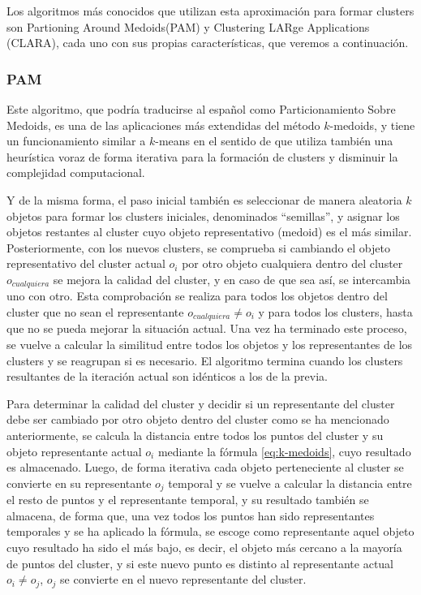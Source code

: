 \documentclass[10pt, a4paper]{article}
\begin{document}
Los algoritmos más conocidos que utilizan esta aproximación para formar clusters son Partioning Around Medoids(PAM) y Clustering LARge Applications (CLARA), cada uno con sus propias características, que veremos a continuación.


\subsubsection{\textbf{PAM}}

Este algoritmo, que podría traducirse al español como Particionamiento Sobre Medoids, es una de las aplicaciones más extendidas del método $k$-medoids, y tiene un funcionamiento similar a $k$-means en el sentido de que utiliza también una heurística voraz de forma iterativa para la formación de clusters y disminuir la complejidad computacional. 

Y de la misma forma, el paso inicial también es seleccionar de manera aleatoria $k$ objetos para formar los clusters iniciales, denominados ``semillas'', y asignar los objetos restantes al cluster cuyo objeto representativo (medoid) es el más similar. Posteriormente, con los nuevos clusters, se comprueba si cambiando el objeto representativo del cluster actual $o_i$ por otro objeto cualquiera dentro del cluster $o_{cualquiera}$ se mejora la calidad del cluster, y en caso de que sea así, se intercambia uno con otro. Esta comprobación se realiza para todos los objetos dentro del cluster que no sean el representante $o_{cualquiera} \neq o_i$ y para todos los clusters, hasta que no se pueda mejorar la situación actual. Una vez ha terminado este proceso, se vuelve a calcular la similitud entre todos los objetos y los representantes de los clusters y se reagrupan si es necesario. El algoritmo termina cuando los clusters resultantes de la iteración actual son idénticos a los de la previa. 

Para determinar la calidad del cluster y decidir si un representante del cluster debe ser cambiado por otro objeto dentro del cluster como se ha mencionado anteriormente, se calcula la distancia entre todos los puntos del cluster y su objeto representante actual $o_i$ mediante la fórmula \ref{eq:k-medoids}, cuyo resultado es almacenado. Luego, de forma iterativa cada objeto perteneciente al cluster se convierte en su representante $o_j$ temporal y se vuelve a calcular la distancia entre el resto de puntos y el representante temporal, y su resultado también se almacena, de forma que, una vez todos los puntos han sido representantes temporales y se ha aplicado la fórmula, se escoge como representante aquel objeto cuyo resultado ha sido el más bajo, es decir, el objeto más cercano a la mayoría de puntos del cluster, y si este nuevo punto es distinto al representante actual $o_i \neq o_j$, $o_j$ se convierte en el nuevo representante del cluster. 
\end{document}
